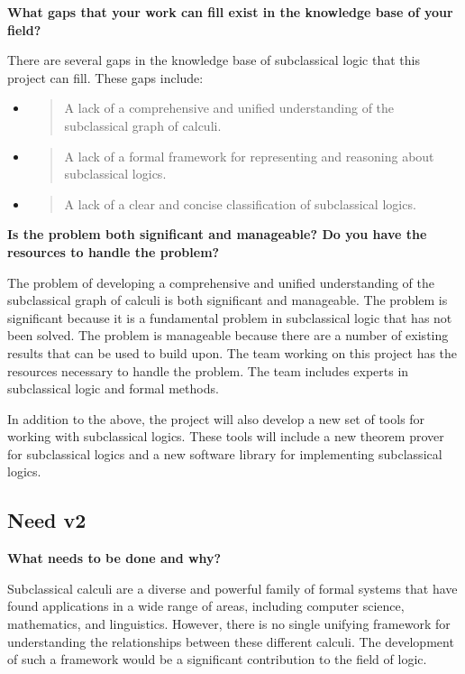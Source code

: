 \textbf{What gaps that your work can fill exist in the knowledge base of
your field?}

There are several gaps in the knowledge base of subclassical logic that
this project can fill. These gaps include:

\begin{itemize}
\item
  \begin{quote}
  A lack of a comprehensive and unified understanding of the
  subclassical graph of calculi.
  \end{quote}
\item
  \begin{quote}
  A lack of a formal framework for representing and reasoning about
  subclassical logics.
  \end{quote}
\item
  \begin{quote}
  A lack of a clear and concise classification of subclassical logics.
  \end{quote}
\end{itemize}

\textbf{Is the problem both significant and manageable? Do you have the
resources to handle the problem?}

The problem of developing a comprehensive and unified understanding of
the subclassical graph of calculi is both significant and manageable.
The problem is significant because it is a fundamental problem in
subclassical logic that has not been solved. The problem is manageable
because there are a number of existing results that can be used to build
upon. The team working on this project has the resources necessary to
handle the problem. The team includes experts in subclassical logic and
formal methods.

In addition to the above, the project will also develop a new set of
tools for working with subclassical logics. These tools will include a
new theorem prover for subclassical logics and a new software library
for implementing subclassical logics.

\hypertarget{need-v2}{%
\subsection{Need v2}\label{need-v2}}

\textbf{What needs to be done and why?}

Subclassical calculi are a diverse and powerful family of formal systems
that have found applications in a wide range of areas, including
computer science, mathematics, and linguistics. However, there is no
single unifying framework for understanding the relationships between
these different calculi. The development of such a framework would be a
significant contribution to the field of logic.

